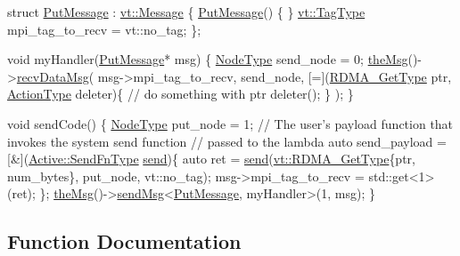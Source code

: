 \begin{DoxyCode}
\textcolor{keyword}{struct }\hyperlink{namespacevt_1_1rdma_ae0a0330c647ec5ac5d508750f4cd4a06}{PutMessage} : \hyperlink{structvt_1_1messaging_1_1_active_msg}{vt::Message} \{
  \hyperlink{namespacevt_1_1rdma_ae0a0330c647ec5ac5d508750f4cd4a06}{PutMessage}() \{ \}
  \hyperlink{namespacevt_a84ab281dae04a52a4b243d6bf62d0e52}{vt::TagType} mpi\_tag\_to\_recv = vt::no\_tag;
\};

\textcolor{keywordtype}{void} myHandler(\hyperlink{namespacevt_1_1rdma_ae0a0330c647ec5ac5d508750f4cd4a06}{PutMessage}* msg) \{
  \hyperlink{namespacevt_a866da9d0efc19c0a1ce79e9e492f47e2}{NodeType} send\_node = 0;
  \hyperlink{namespacevt_aeafd31f866aeb4dc6fc2f6ee97136350}{theMsg}()->\hyperlink{structvt_1_1messaging_1_1_active_messenger_a33b2e3e047d0b1f6eb1398691f075b31}{recvDataMsg}(
    msg->mpi\_tag\_to\_recv, send\_node,
    [=](\hyperlink{namespacevt_a1cab7f4860f65a49ad2c042d6240f288}{RDMA\_GetType} ptr, \hyperlink{namespacevt_ae0a5a7b18cc99d7b732cb4d44f46b0f3}{ActionType} deleter)\{
       \textcolor{comment}{// do something with ptr}
       deleter();
    \}
  );
\}

\textcolor{keywordtype}{void} sendCode() \{
  \hyperlink{namespacevt_a866da9d0efc19c0a1ce79e9e492f47e2}{NodeType} put\_node = 1;
  \textcolor{comment}{// The user's payload function that invokes the system send function}
  \textcolor{comment}{// passed to the lambda}
  \textcolor{keyword}{auto} send\_payload = [&](\hyperlink{structvt_1_1messaging_1_1_active_messenger_a9821bc2d924729107f08fadf5a217537}{Active::SendFnType} \hyperlink{namespacevt_1_1objgroup_aa2e134493c6b8a23d7d5e86bd9df1a70}{send})\{
    \textcolor{keyword}{auto} ret = \hyperlink{namespacevt_1_1objgroup_aa2e134493c6b8a23d7d5e86bd9df1a70}{send}(\hyperlink{namespacevt_a1cab7f4860f65a49ad2c042d6240f288}{vt::RDMA\_GetType}\{ptr, num\_bytes\}, put\_node, vt::no\_tag);
    msg->mpi\_tag\_to\_recv = std::get<1>(ret);
  \};
  \hyperlink{namespacevt_aeafd31f866aeb4dc6fc2f6ee97136350}{theMsg}()->\hyperlink{group__preregister_ga0162a39473e7f9b490a79a7983d949ac}{sendMsg}<\hyperlink{namespacevt_1_1rdma_ae0a0330c647ec5ac5d508750f4cd4a06}{PutMessage}, myHandler>(1, msg);
\}
\end{DoxyCode}
 

\subsection{Function Documentation}
\mbox{\label{group__sendpayload_ga8fd0c564e6c5d0bde3fbfa2e9a9d5ad9}} 
